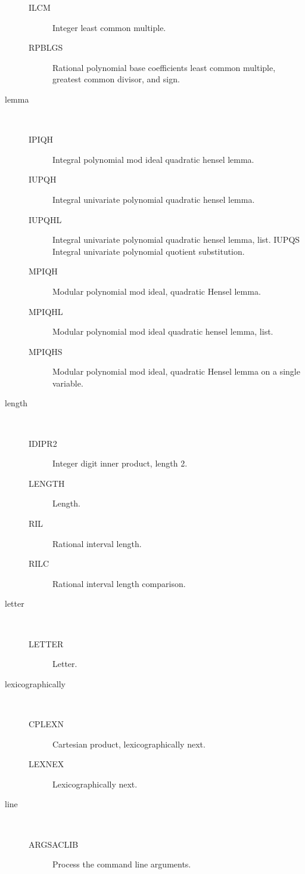 \begin{description}
  \begin{description}
  \item[ILCM]  Integer least common multiple.
  \item[RPBLGS]  Rational polynomial base coefficients least common multiple,
    greatest common divisor, and sign.
  \end{description}
\item[lemma] \ \ 
  \begin{description}
  \item[IPIQH]  Integral polynomial mod ideal quadratic hensel lemma.
  \item[IUPQH]  Integral univariate polynomial quadratic hensel lemma.
  \item[IUPQHL]  Integral univariate polynomial quadratic hensel lemma, list.
    IUPQS Integral univariate polynomial quotient substitution.
  \item[MPIQH]  Modular polynomial mod ideal, quadratic Hensel lemma.
  \item[MPIQHL]  Modular polynomial mod ideal quadratic hensel lemma, list.
  \item[MPIQHS]  Modular polynomial mod ideal, quadratic Hensel lemma on a
    single variable.
  \end{description}
\item[length] \ \ 
  \begin{description}
  \item[IDIPR2]  Integer digit inner product, length 2.
  \item[LENGTH]  Length.
  \item[RIL]  Rational interval length.
  \item[RILC]  Rational interval length comparison.
  \end{description}
\item[letter] \ \ 
  \begin{description}
  \item[LETTER]  Letter.
  \end{description}
\item[lexicographically] \ \ 
  \begin{description}
  \item[CPLEXN]  Cartesian product, lexicographically next.
  \item[LEXNEX]  Lexicographically next.
  \end{description}
\item[line] \ \ 
  \begin{description}
  \item[ARGSACLIB]  Process the command line arguments.

\end{description}
\end{description}
